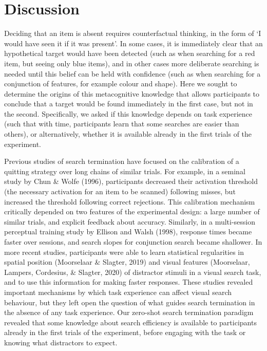 \documentclass[12pt,twoside]{reedthesis}
\begin{document}
\hypertarget{discussion}{%
\section{Discussion}\label{discussion}}

Deciding that an item is absent requires counterfactual thinking, in the form of `I would have seen it if it was present'. In some cases, it is immediately clear that an hypothetical target would have been detected (such as when searching for a red item, but seeing only blue items), and in other cases more deliberate searching is needed until this belief can be held with confidence (such as when searching for a conjunction of features, for example colour and shape). Here we sought to determine the origins of this metacognitive knowledge that allows participants to conclude that a target would be found immediately in the first case, but not in the second. Specifically, we asked if this knowledge depends on task experience (such that with time, participants learn that some searches are easier than others), or alternatively, whether it is available already in the first trials of the experiment.

Previous studies of search termination have focused on the calibration of a quitting strategy over long chains of similar trials. For example, in a seminal study by Chun \& Wolfe (1996), participants decreased their activation threshold (the necessary activation for an item to be scanned) following misses, but increased the threshold following correct rejections. This calibration mechanism critically depended on two features of the experimental design: a large number of similar trials, and explicit feedback about accuracy. Similarly, in a multi-session perceptual training study by Ellison and Walsh (1998), response times became faster over sessions, and search slopes for conjunction search became shallower. In more recent studies, participants were able to learn statistical regularities in spatial position (Moorselaar \& Slagter, 2019) and visual features (Moorselaar, Lampers, Cordesius, \& Slagter, 2020) of distractor stimuli in a visual search task, and to use this information for making faster responses. These studies revealed important mechanisms by which task experience can affect visual search behaviour, but they left open the question of what guides search termination in the absence of any task experience. Our zero-shot search termination paradigm revealed that some knowledge about search efficiency is available to participants already in the first trials of the experiment, before engaging with the task or knowing what distractors to expect.
\end{document}
